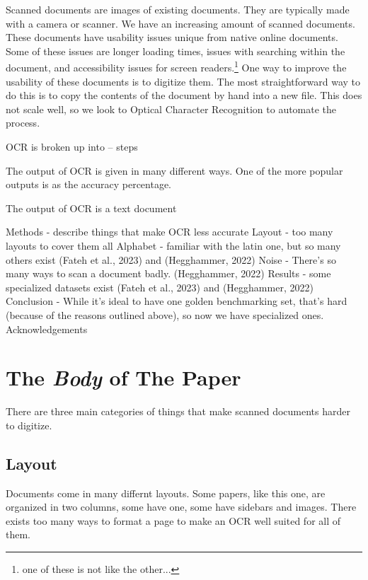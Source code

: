 \documentclass[sigplan,screen,nonacm]{acmart}
\begin{document}
Scanned documents are images of existing documents. They are typically made with a camera or scanner. We have an increasing amount of scanned documents. These documents have usability issues unique from native online documents. 
Some of these issues are longer loading times, issues with searching within the document, and accessibility issues for screen readers.\footnote{one of these is not like the other...} 
One way to improve the usability of these documents is to digitize them. The most straightforward way to do this is to copy the contents of the document by hand into a new file. This does not scale well, so we look to Optical Character Recognition to automate the process. 

OCR is broken up into -- steps

The output of OCR is given in many different ways. One of the more popular outputs is as the accuracy percentage.

The output of OCR is a text document



Methods - describe things that make OCR less accurate
Layout - too many layouts to cover them all 
Alphabet - familiar with the latin one, but so many others exist (Fateh et al., 2023) and (Hegghammer, 2022)
Noise - There’s so many ways to scan a document badly. (Hegghammer, 2022)
Results - some specialized datasets exist (Fateh et al., 2023) and (Hegghammer, 2022)
Conclusion - While it’s ideal to have one golden benchmarking set, that's hard (because of the reasons outlined above), so now we have specialized ones.
Acknowledgements

\section{The {\it Body} of The Paper}
\label{sec:body}

There are three main categories of things that make scanned documents harder to digitize. 

\subsection{Layout}
\label{sec:Layout}

Documents come in many differnt layouts. Some papers, like this one, are organized in two columns, some have one, some have sidebars and images. There exists too many ways to format a page to make an OCR well suited for all of them.
\end{document}
